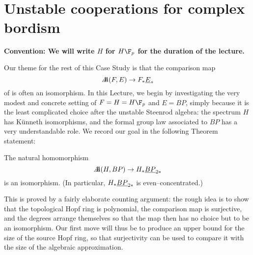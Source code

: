 











\section{Unstable cooperations for complex bordism}\label{COableCoopnsII}

\begin{center}
\textbf{Convention: We will write $H$ for $H\F_p$ for the duration of the lecture.}
\end{center}

Our theme for the rest of this Case Study is that the comparison map \[A\!\!\!A(F, E) \to F_* \underline{\smash{E}}_{*}\] of  is often an isomorphism.  In this Lecture, we begin by investigating the very modest and concrete setting of $F = H = H\F_p$ and $E = BP$, simply because it is the least complicated choice after the unstable Steenrod algebra: the spectrum $H$ has K\"unneth isomorphisms, and the formal group law associated to $BP$ has a very understandable role.  We record our goal in the following Theorem statement:

\begin{theorem}\label{HFpBPCooperationsTheorem}
The natural homomorphism \[A\!\!\!A(H, BP) \to H_* \underline{\smash{BP}}_{2*}\] is an isomorphism.  (In particular, $H_* \underline{\smash{BP}}_{2*}$ is even--concentrated.)
\end{theorem}

\noindent This is proved by a fairly elaborate counting argument: the rough idea is to show that the topological Hopf ring is polynomial, the comparison map is surjective, and the degrees arrange themselves so that the map then has no choice but to be an isomorphism.  Our first move will thus be to produce an upper bound for the size of the source Hopf ring, so that surjectivity can be used to compare it with the size of the algebraic approximation.

